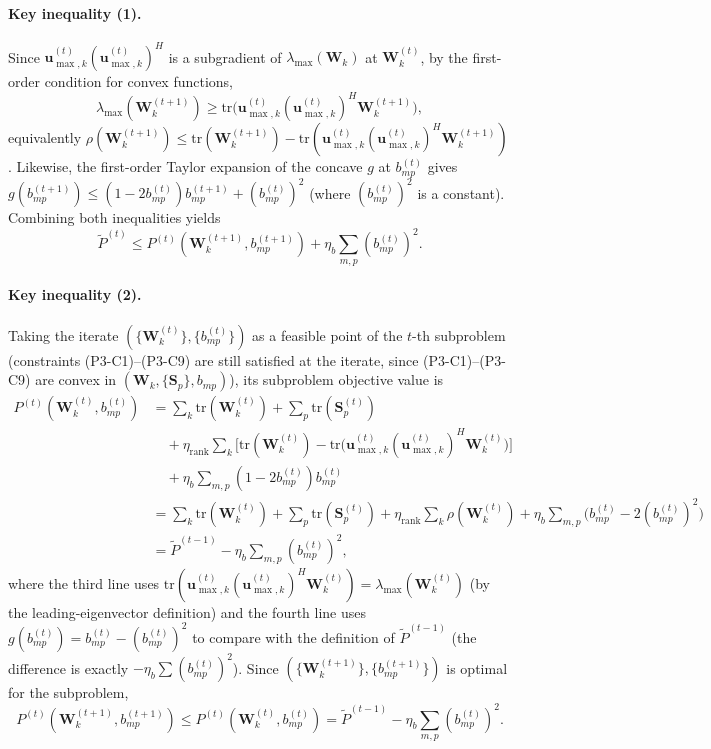 \documentclass[12pt,a4paper]{article}
\newcommand{\vect}[1]{\mathbf{#1}}
\newcommand{\mat}[1]{\mathbf{#1}}
\newcommand{\tr}{\text{tr}}
\begin{document}
\paragraph{Key inequality (1).} Since $\vect{u}_{\max,k}^{(t)} (\vect{u}_{\max,k}^{(t)})^H$ is a subgradient of $\lambda_{\max}(\mat{W}_k)$ at $\mat{W}_k^{(t)}$, by the first-order condition for convex functions,
\[
\lambda_{\max}(\mat{W}_k^{(t+1)}) \geq \tr\big( \vect{u}_{\max,k}^{(t)} (\vect{u}_{\max,k}^{(t)})^H \mat{W}_k^{(t+1)} \big),
\]
equivalently $\rho(\mat{W}_k^{(t+1)}) \leq \tr(\mat{W}_k^{(t+1)}) - \tr(\vect{u}_{\max,k}^{(t)} (\vect{u}_{\max,k}^{(t)})^H \mat{W}_k^{(t+1)})$. Likewise, the first-order Taylor expansion of the concave $g$ at $b_{mp}^{(t)}$ gives $g(b_{mp}^{(t+1)}) \leq (1-2b_{mp}^{(t)}) b_{mp}^{(t+1)} + (b_{mp}^{(t)})^2$ (where $(b_{mp}^{(t)})^2$ is a constant). Combining both inequalities yields
\[
\tilde{P}^{(t)} \leq P^{(t)}(\mat{W}_k^{(t+1)}, b_{mp}^{(t+1)}) + \eta_b \sum_{m,p} (b_{mp}^{(t)})^2.
\]

\paragraph{Key inequality (2).} Taking the iterate $(\{\mat{W}_k^{(t)}\}, \{b_{mp}^{(t)}\})$ as a feasible point of the $t$-th subproblem (constraints (P3-C1)--(P3-C9) are still satisfied at the iterate, since (P3-C1)--(P3-C9) are convex in $(\mat{W}_k, \{\mat{S}_p\}, b_{mp})$), its subproblem objective value is
\begin{align*}
P^{(t)}(\mat{W}_k^{(t)}, b_{mp}^{(t)}) 
&= \sum_k \tr(\mat{W}_k^{(t)}) + \sum_p \tr(\mat{S}_p^{(t)}) \\
&\quad + \eta_{\text{rank}} \sum_k \Big[\tr(\mat{W}_k^{(t)}) - \tr\big(\vect{u}_{\max,k}^{(t)} (\vect{u}_{\max,k}^{(t)})^H \mat{W}_k^{(t)}\big)\Big] \\
&\quad + \eta_b \sum_{m,p} (1 - 2b_{mp}^{(t)}) b_{mp}^{(t)} \\
&= \sum_k \tr(\mat{W}_k^{(t)}) + \sum_p \tr(\mat{S}_p^{(t)}) + \eta_{\text{rank}} \sum_k \rho(\mat{W}_k^{(t)}) + \eta_b \sum_{m,p} \big(b_{mp}^{(t)} - 2(b_{mp}^{(t)})^2\big) \\
&= \tilde{P}^{(t-1)} - \eta_b \sum_{m,p} (b_{mp}^{(t)})^2,
\end{align*}
where the third line uses $\tr(\vect{u}_{\max,k}^{(t)} (\vect{u}_{\max,k}^{(t)})^H \mat{W}_k^{(t)}) = \lambda_{\max}(\mat{W}_k^{(t)})$ (by the leading-eigenvector definition) and the fourth line uses $g(b_{mp}^{(t)}) = b_{mp}^{(t)} - (b_{mp}^{(t)})^2$ to compare with the definition of $\tilde{P}^{(t-1)}$ (the difference is exactly $-\eta_b \sum (b_{mp}^{(t)})^2$). Since $(\{\mat{W}_k^{(t+1)}\}, \{b_{mp}^{(t+1)}\})$ is optimal for the subproblem,
\[
P^{(t)}(\mat{W}_k^{(t+1)}, b_{mp}^{(t+1)}) \leq P^{(t)}(\mat{W}_k^{(t)}, b_{mp}^{(t)}) = \tilde{P}^{(t-1)} - \eta_b \sum_{m,p} (b_{mp}^{(t)})^2.
\]
\end{document}
